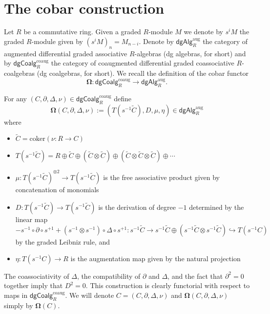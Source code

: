 \section{The cobar construction}

Let $R$ be a commutative ring. Given a graded $R$-module $M$ we denote by $s^{i}M$ the graded $R$-module given by $(s^{i}M)_n= M_{n-i}$.
Denote by $\mathsf{dgAlg}^{\text{aug}}_R$ the category of augmented differential graded associative $R$-algebras (dg algebras, for short) and by $\mathsf{dgCoalg}^{\text{coaug}}_R$ the category of coaugmented differential graded coassociative $R$-coalgebras (dg coalgebras, for short). We recall the definition of the cobar functor 
$$\mathbf{\Omega}: \mathsf{dgCoalg}^{\text{coaug}}_R \to \mathsf{dgAlg}^{\text{aug}}_R.$$

For any $(C, \partial, \Delta, \nu)  \in \mathsf{dgCoalg}^{\text{coaug}}_R$ define
$$\mathbf{\Omega}(C, \partial, \Delta, \nu) := ( T(s^{-1}  \widetilde{C} ), D, \mu, \eta) \in \mathsf{dgAlg}^{\text{aug}}_R$$ where 
\begin{itemize}
\item $\widetilde{C}=\text{coker}(\nu: R \to C)$
\item $T(s^{-1} \widetilde{C})= R \oplus \widetilde{C} \oplus (\widetilde{C}  \otimes \widetilde{C} ) \oplus ( \widetilde{C} \otimes \widetilde{C} \otimes \widetilde{C} ) \oplus\cdots $
\item $\mu: T(s^{-1}  \widetilde{C} )^{\otimes 2} \to T(s^{-1}  \widetilde{C} ) $ is the free associative product given by concatenation of monomials
\item $D: T(s^{-1}  \widetilde{C} ) \to T(s^{-1}  \widetilde{C} )$ is the derivation of degree $-1$ determined by the linear map $$- s^{-1} \circ \partial \circ s^{+1} + (s^{-1} \otimes s^{-1}) \circ \Delta \circ s^{+1}: s^{-1}\widetilde{C} \to s^{-1}\widetilde{C} \oplus (s^{-1}\widetilde{C} \otimes s^{-1}\widetilde{C}) \hookrightarrow T(s^{-1}C)$$  by the graded Leibniz rule, and
\item $\eta: T(s^{-1}C) \to R$ is the augmentation map given by the natural projection
\end{itemize}

The coassociativity of $\Delta$, the compatibility of $\partial$ and $\Delta$, and the fact that $\partial^2 =0$ together imply that $D^2=0$. This construction is clearly functorial with respect to maps in $\mathsf{dgCoalg}^{\text{coaug}}_R$. We will denote $C=(C, \partial, \Delta, \nu)$ and $\mathbf{\Omega} (C, \partial, \Delta, \nu)$ simply by $\mathbf{\Omega}(C)$. 

